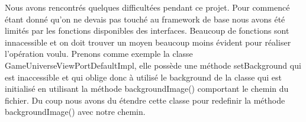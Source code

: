 \documentclass{article}
\begin{document}
Nous avons rencontrés quelques difficultées pendant ce projet. Pour commencé étant donné qu'on ne devais pas touché au framework de base nous avons été limités par les fonctions disponibles des interfaces. Beaucoup de fonctions sont innacessible et on doit trouver un moyen beaucoup moins évident pour réaliser l'opération voulu. Prenons comme exemple la classe GameUniverseViewPortDefaultImpl, elle possède une méthode setBackground qui est inaccessible et qui oblige donc à utilisé le background de la classe qui est initialisé en utilisant la méthode backgroundImage() comportant le chemin du fichier. Du coup nous avons du étendre cette classe pour redefinir la méthode backgroundImage() avec notre chemin.
\end{document}
